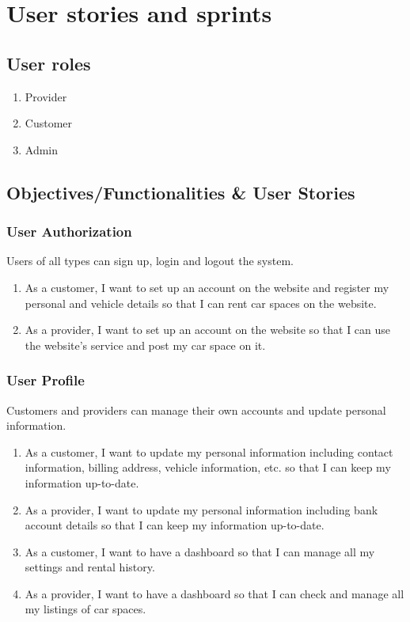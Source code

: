 \documentclass[12pt]{article}
\begin{document}
\section{User stories and sprints}

\subsection{User roles}

\begin{enumerate}
  \item Provider
  \item Customer
  \item Admin
\end{enumerate}

\subsection{Objectives/Functionalities \& User Stories}

\subsubsection{User Authorization}

Users of all types can sign up, login and logout the system.

\begin{enumerate}
  \item As a customer, I want to set up an account on the website and register my personal and vehicle details so that I can rent car spaces on the website.
  \item As a provider, I want to set up an account on the website so that I can use the website's service and post my car space on it.
\end{enumerate}

\subsubsection{User Profile}

Customers and providers can manage their own accounts and update personal information.

\begin{enumerate}[resume]
  \item As a customer, I want to update my personal information including contact information, billing address, vehicle information, etc. so that I can keep my information up-to-date.
  \item As a provider, I want to update my personal information including bank account details so that I can keep my information up-to-date.
  \item As a customer, I want to have a dashboard so that I can manage all my settings and rental history.
  \item As a provider, I want to have a dashboard so that I can check and manage all my listings of car spaces.
\end{enumerate}
\end{document}
